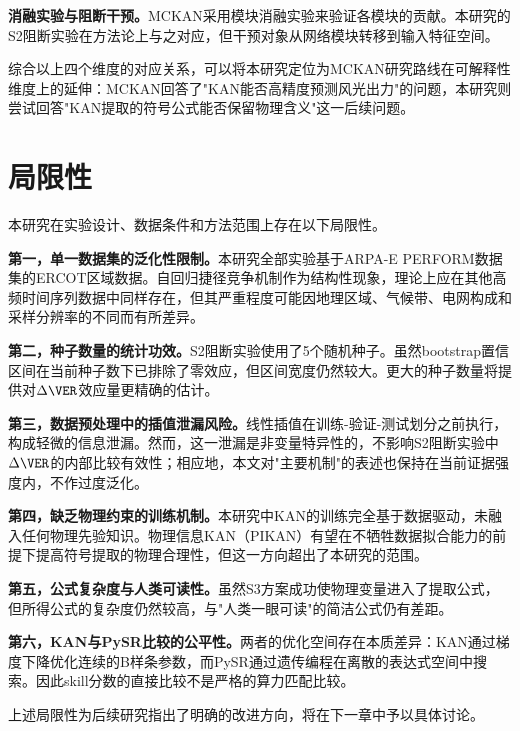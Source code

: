 \textbf{消融实验与阻断干预。}MCKAN采用模块消融实验来验证各模块的贡献。本研究的S2阻断实验在方法论上与之对应，但干预对象从网络模块转移到输入特征空间。

综合以上四个维度的对应关系，可以将本研究定位为MCKAN研究路线在可解释性维度上的延伸：MCKAN回答了"KAN能否高精度预测风光出力"的问题，本研究则尝试回答"KAN提取的符号公式能否保留物理含义"这一后续问题。

\section{局限性}

本研究在实验设计、数据条件和方法范围上存在以下局限性。

\textbf{第一，单一数据集的泛化性限制。}本研究全部实验基于ARPA-E PERFORM数据集的ERCOT区域数据。自回归捷径竞争机制作为结构性现象，理论上应在其他高频时间序列数据中同样存在，但其严重程度可能因地理区域、气候带、电网构成和采样分辨率的不同而有所差异。

\textbf{第二，种子数量的统计功效。}S2阻断实验使用了5个随机种子。虽然bootstrap置信区间在当前种子数下已排除了零效应，但区间宽度仍然较大。更大的种子数量将提供对$\Delta\VER$效应量更精确的估计。

\textbf{第三，数据预处理中的插值泄漏风险。}线性插值在训练-验证-测试划分之前执行，构成轻微的信息泄漏。然而，这一泄漏是非变量特异性的，不影响S2阻断实验中$\Delta\VER$的内部比较有效性；相应地，本文对"主要机制"的表述也保持在当前证据强度内，不作过度泛化。

\textbf{第四，缺乏物理约束的训练机制。}本研究中KAN的训练完全基于数据驱动，未融入任何物理先验知识。物理信息KAN（PIKAN）有望在不牺牲数据拟合能力的前提下提高符号提取的物理合理性，但这一方向超出了本研究的范围。

\textbf{第五，公式复杂度与人类可读性。}虽然S3方案成功使物理变量进入了提取公式，但所得公式的复杂度仍然较高，与"人类一眼可读"的简洁公式仍有差距。

\textbf{第六，KAN与PySR比较的公平性。}两者的优化空间存在本质差异：KAN通过梯度下降优化连续的B样条参数，而PySR通过遗传编程在离散的表达式空间中搜索。因此skill分数的直接比较不是严格的算力匹配比较。

上述局限性为后续研究指出了明确的改进方向，将在下一章中予以具体讨论。
